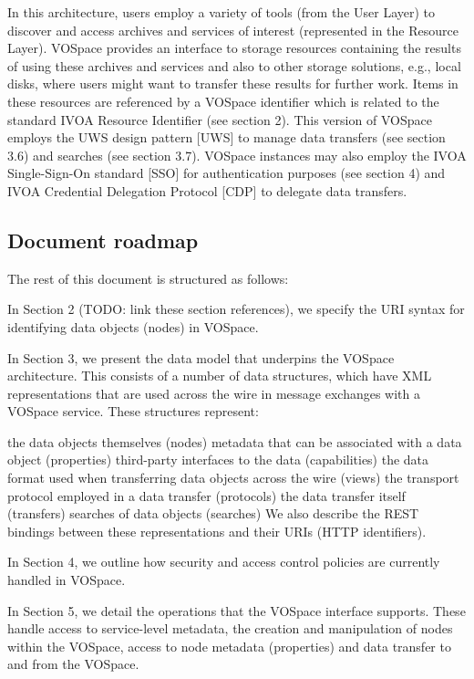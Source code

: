 \documentclass[11pt,a4paper]{ivoa}
\begin{document}
In this architecture, users employ a variety of tools (from the User Layer) to discover and access archives and services of interest (represented in the Resource Layer). VOSpace provides an interface to storage resources containing the results of using these archives and services and also to other storage solutions, e.g., local disks, where users might want to transfer these results for further work. Items in these resources are referenced by a VOSpace identifier which is related to the standard IVOA Resource Identifier (see section 2). This version of VOSpace employs the UWS design pattern [UWS] to manage data transfers (see section 3.6) and searches (see section 3.7). VOSpace instances may also employ the IVOA Single-Sign-On standard [SSO] for authentication purposes (see section 4) and IVOA Credential Delegation Protocol [CDP] to delegate data transfers.

\subsection{Document roadmap}
The rest of this document is structured as follows:

In Section 2 (TODO: link these section references), we specify the URI syntax for identifying data objects (nodes) in VOSpace.

In Section 3, we present the data model that underpins the VOSpace architecture. This consists of a number of data structures, which have XML representations that are used across the wire in message exchanges with a VOSpace service. These structures represent:

the data objects themselves (nodes)
metadata that can be associated with a data object (properties)
third-party interfaces to the data (capabilities)
the data format used when transferring data objects across the wire (views)
the transport protocol employed in a data transfer (protocols)
the data transfer itself (transfers)
searches of data objects (searches)
We also describe the REST bindings between these representations and their URIs (HTTP identifiers).

In Section 4, we outline how security and access control policies are currently handled in VOSpace.

In Section 5, we detail the operations that the VOSpace interface supports. These handle access to service-level metadata, the creation and manipulation of nodes within the VOSpace, access to node metadata (properties) and data transfer to and from the VOSpace.
\end{document}
